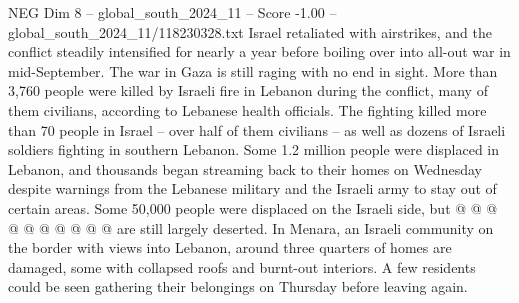 \begin{textsample}{NEG Dim 8 – global\_south\_2024\_11 – Score -1.00 – global\_south\_2024\_11/118230328.txt}
Israel retaliated with airstrikes, and the conflict steadily intensified for nearly a year before boiling over into all-out war in mid-September.
The war in Gaza is still raging with no end in sight.
More than 3,760 people were killed by Israeli fire in Lebanon during the conflict, many of them civilians, according to Lebanese health officials.
The fighting killed more than 70 people in Israel -- over half of them civilians -- as well as dozens of Israeli soldiers fighting in southern Lebanon.
Some 1.2 million people were displaced in Lebanon, and thousands began streaming back to their homes on Wednesday despite warnings from the Lebanese military and the Israeli army to stay out of certain areas.
Some 50,000 people were displaced on the Israeli side, but @ @ @ @ @ @ @ @ @ @ are still largely deserted.
In Menara, an Israeli community on the border with views into Lebanon, around three quarters of homes are damaged, some with collapsed roofs and burnt-out interiors.
A few residents could be seen gathering their belongings on Thursday before leaving again.

\end{textsample}
